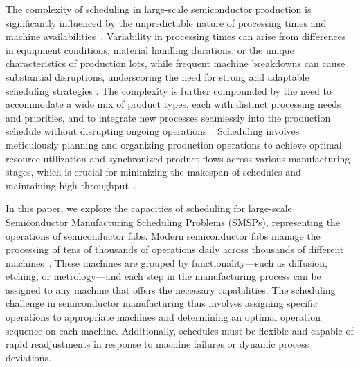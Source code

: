 The complexity of scheduling in large-scale semiconductor production %
is significantly influenced by the unpredictable nature of processing times and machine availabilities~\cite{May2006}. Variability in processing times can arise from differences in equipment conditions, material handling durations, or the unique characteristics of production lots, while frequent machine breakdowns can cause substantial disruptions, underscoring the need for strong and adaptable scheduling strategies \cite{leachman1996benchmarking}.
The complexity is further compounded by the need to accommodate a wide mix of product types, each with distinct processing needs and priorities, and to integrate new processes seamlessly into the production schedule without disrupting ongoing operations~\cite{Moench2011}.
Scheduling involves meticulously planning and organizing production operations to achieve optimal resource utilization and synchronized product flows across various manufacturing stages, which is crucial for minimizing the makespan of schedules and maintaining high throughput~\cite{schumann2022scheduling}. %

In this paper, we explore the capacities of scheduling for large-scale Semiconductor Manufacturing Scheduling Problems (SMSPs), representing the operations of semiconductor fabs. 
Modern semiconductor fabs manage the processing of tens of thousands of operations daily across thousands of different machines~\cite{kopp2020smt2020}. These machines are grouped by functionality—such as diffusion, etching, or metrology—and each step in the manufacturing process can be assigned to any machine that offers the necessary capabilities. The scheduling challenge in semiconductor manufacturing thus involves assigning specific operations to appropriate machines and determining an optimal operation sequence on each machine. Additionally, schedules must be flexible and capable of rapid readjustments in response to machine failures or dynamic process deviations.

